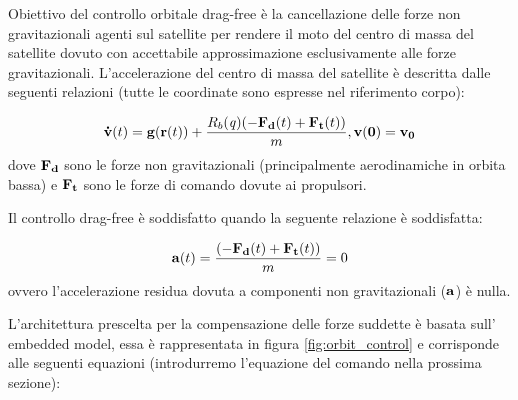 Obiettivo del controllo orbitale drag-free è la cancellazione delle forze non
gravitazionali agenti sul satellite per rendere il moto del centro di massa del
satellite dovuto con accettabile approssimazione esclusivamente alle forze
gravitazionali. L'accelerazione del centro di massa del satellite è descritta
dalle seguenti relazioni (tutte le coordinate sono espresse nel riferimento
corpo):

\begin{equation}
\mathbf{\dot{v}}(t) = \mathbf{g}(\mathbf{r}(t))+
\frac{R_b(\mathit{q})(-\mathbf{F_d}(t)+\mathbf{F_t}(t))}{m},
\mathbf{v(0)=v_	0}
\end{equation}
dove $\mathbf{F_d}$ sono le forze non gravitazionali (principalmente
aerodinamiche in orbita bassa) e $\mathbf{F_t}$ sono le forze di comando
dovute ai propulsori.

Il controllo drag-free è soddisfatto quando la seguente relazione è soddisfatta:

\begin{equation}
\mathbf{a}(t) = \frac{(- \mathbf{F_d}(t) + \mathbf{F_t}(t))}{m}=0
\end{equation}
ovvero l'accelerazione residua dovuta a componenti non gravitazionali
($\mathbf{a}$) è nulla.

L'architettura prescelta per la compensazione delle forze suddette è basata 
sull' embedded model, essa è rappresentata in figura \ref{fig:orbit_control} e
corrisponde alle seguenti equazioni (introdurremo l'equazione del comando
nella prossima sezione):


